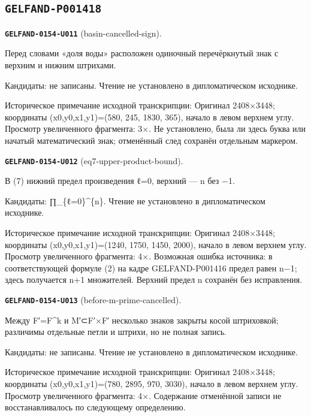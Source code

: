 \subsection*{\texttt{GELFAND-P001418}}
\par\noindent\leavevmode{}\label{GELFAND-0154-U011}\textbf{\texttt{GELFAND-0154-U011}} (basin-cancelled-sign).\nopagebreak[4]\par
Перед словами «доля воды» расположен одиночный перечёркнутый знак с верхним и нижним штрихами.\par
Кандидаты: не записаны. Чтение не установлено в дипломатическом исходнике.\par
Историческое примечание исходной транскрипции: Оригинал 2408×3448; координаты (x0,y0,x1,y1)=(580, 245, 1830, 365), начало в левом верхнем углу. Просмотр увеличенного фрагмента: 3×. Не установлено, была ли здесь буква или начатый математический знак; отменённый след сохранён отдельным маркером.\par\medskip
\par\noindent\leavevmode{}\label{GELFAND-0154-U012}\textbf{\texttt{GELFAND-0154-U012}} (eq7-upper-product-bound).\nopagebreak[4]\par
В (7) нижний предел произведения ℓ=0, верхний — n без −1.\par
Кандидаты: ∏\_\{ℓ=0\}\textasciicircum{}\{n\}. Чтение не установлено в дипломатическом исходнике.\par
Историческое примечание исходной транскрипции: Оригинал 2408×3448; координаты (x0,y0,x1,y1)=(1240, 1750, 1450, 2000), начало в левом верхнем углу. Просмотр увеличенного фрагмента: 4×. Возможная ошибка источника: в соответствующей формуле (2) на кадре GELFAND-P001416 предел равен n−1; здесь получается n+1 множителей. Верхний предел n сохранён без исправления.\par\medskip
\par\noindent\leavevmode{}\label{GELFAND-0154-U013}\textbf{\texttt{GELFAND-0154-U013}} (before-m-prime-cancelled).\nopagebreak[4]\par
Между F′=F\textasciicircum{}k и M′⊂F′×F′ несколько знаков закрыты косой штриховкой; различимы отдельные петли и штрихи, но не полная запись.\par
Кандидаты: не записаны. Чтение не установлено в дипломатическом исходнике.\par
Историческое примечание исходной транскрипции: Оригинал 2408×3448; координаты (x0,y0,x1,y1)=(780, 2895, 970, 3030), начало в левом верхнем углу. Просмотр увеличенного фрагмента: 4×. Содержание отменённой записи не восстанавливалось по следующему определению.\par\medskip

